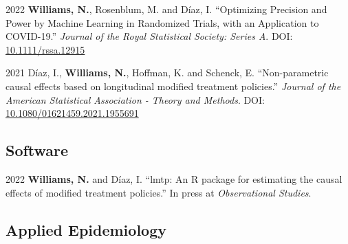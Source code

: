 \documentclass[12pt,letterpaper]{report}
\begin{document}
    \begin{tablist}
    
        \item[2022] \tab \textbf{Williams, N.}, Rosenblum, M. and Díaz, I. \enquote {Optimizing Precision and Power by Machine Learning in Randomized Trials, with an Application to COVID-19.} \textit {Journal of the Royal Statistical Society: Series A}. DOI: \href{https://doi.org/10.1111/rssa.12915}{10.1111/rssa.12915}
    
       \item[2021] \tab Díaz, I., \textbf{Williams, N.}, Hoffman, K. and Schenck, E. \enquote{Non-parametric causal effects based on longitudinal modified treatment policies.} \textit{Journal of the American Statistical Association - Theory and Methods}. DOI: \href{https://doi.org/10.1080/01621459.2021.1955691}{10.1080/01621459.2021.1955691}
       
    \end{tablist}
    
    \subsection*{Software}
    
    \begin{tablist}
    
        \item[2022] \tab \textbf{Williams, N.} and Díaz, I. \enquote{lmtp: An R package for estimating the causal effects of modified treatment policies.} In press at \textit{Observational Studies}.
    
    \end{tablist}

    \subsection*{Applied Epidemiology}
\end{document}
